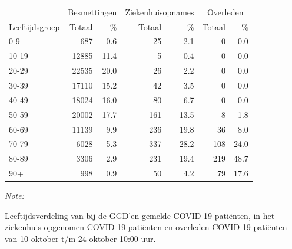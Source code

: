 \documentclass[
  english,
  man,floatsintext]{apa6}
\begin{document}
\begin{table}[H]
\centering\begingroup\fontsize{11}{13}\selectfont

\begin{threeparttable}
\begin{tabular}{lrrrrrr}
\toprule
\multicolumn{1}{c}{ } & \multicolumn{2}{c}{Besmettingen} & \multicolumn{2}{c}{Ziekenhuisopnames} & \multicolumn{2}{c}{Overleden} \\
\cmidrule(l{3pt}r{3pt}){2-3} \cmidrule(l{3pt}r{3pt}){4-5} \cmidrule(l{3pt}r{3pt}){6-7}
Leeftijdsgroep & Totaal & \% & Totaal & \% & Totaal & \%\\
\midrule
0-9 & 687 & 0.6 & 25 & 2.1 & 0 & 0.0\\
10-19 & 12885 & 11.4 & 5 & 0.4 & 0 & 0.0\\
20-29 & 22535 & 20.0 & 26 & 2.2 & 0 & 0.0\\
30-39 & 17110 & 15.2 & 42 & 3.5 & 0 & 0.0\\
40-49 & 18024 & 16.0 & 80 & 6.7 & 0 & 0.0\\
50-59 & 20002 & 17.7 & 161 & 13.5 & 8 & 1.8\\
60-69 & 11139 & 9.9 & 236 & 19.8 & 36 & 8.0\\
70-79 & 6028 & 5.3 & 337 & 28.2 & 108 & 24.0\\
80-89 & 3306 & 2.9 & 231 & 19.4 & 219 & 48.7\\
90+ & 998 & 0.9 & 50 & 4.2 & 79 & 17.6\\
\bottomrule
\end{tabular}
\begin{tablenotes}
\item \textit{Note: } 
\item Leeftijdsverdeling van bij de GGD’en gemelde COVID-19 patiënten, in het ziekenhuis opgenomen COVID-19 patiënten en overleden COVID-19 patiënten van 10 oktober t/m 24 oktober 10:00 uur.
\end{tablenotes}
\end{threeparttable}
\endgroup{}
\end{table}
\end{document}
